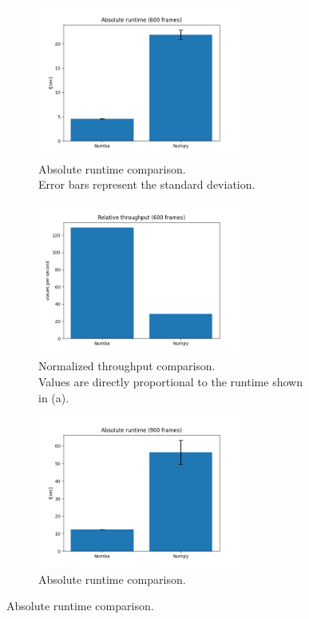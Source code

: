 \begin{figure}[!h]
    \begin{subfigure}[b]{0.48\textwidth}
        \includegraphics*[height=5cm]{absolute_runtime.png}
        \caption{Absolute runtime comparison.\\
        Error bars represent the standard deviation.}
        \label{subfig:absolute_runtime_tkf_frame}
    \end{subfigure}
    \hfill
    \begin{subfigure}[b]{0.48\textwidth}
        \includegraphics*[height=5cm]{relative_throughput.png} 
        \caption{Normalized throughput comparison.\\
        Values are directly proportional to the runtime shown in (a).}
        \label{subfig:relative_throughput_tkf_frame}
    \end{subfigure}
    \vfill
    \begin{subfigure}[b]{0.48\textwidth}
        \includegraphics*[height=5cm]{absolute_runtime_900.png}
        \caption{Absolute runtime comparison.\\}

\end{subfigure}
\end{figure}

